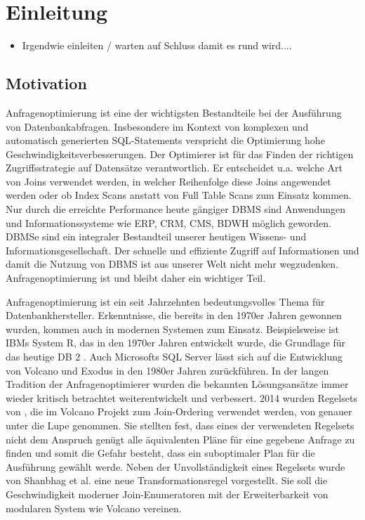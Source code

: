 \chapter{Einleitung}

\begin{itemize}
\item Irgendwie einleiten / warten auf Schluss damit es rund wird....
\end{itemize}



\section{Motivation}


Anfragenoptimierung ist eine der wichtigsten Bestandteile bei der Ausführung von Datenbankabfragen. Insbesondere im Kontext von komplexen und automatisch generierten SQL-Statements verspricht die Optimierung hohe Geschwindigkeitsverbesserungen. Der Optimierer ist für das Finden der richtigen Zugriffsstrategie auf Datensätze verantwortlich. Er entscheidet u.a. welche Art von Joins verwendet werden, in welcher Reihenfolge diese Joins angewendet werden oder ob Index Scans anstatt von Full Table Scans zum Einsatz kommen. Nur durch die erreichte Performance heute gängiger \ac{DBMS} sind Anwendungen und Informationssysteme wie \ac{ERP}, \ac{CRM}, \ac{CMS}, \ac{BDWH} möglich geworden. \ac{DBMS}e sind ein integraler Bestandteil unserer heutigen Wissens- und Informationsgesellschaft. Der schnelle und effiziente Zugriff auf Informationen und damit die Nutzung von \ac{DBMS} ist aus unserer Welt nicht mehr wegzudenken. Anfragenoptimierung ist und bleibt daher ein wichtiger Teil.

Anfragenoptimierung ist ein seit Jahrzehnten bedeutungsvolles Thema für Datenbankhersteller. Erkenntnisse, die bereits in den 1970er Jahren gewonnen wurden, kommen auch in modernen Systemen zum Einsatz. Beispielsweise ist IBMs System R, das in den 1970er Jahren entwickelt wurde, die Grundlage für das heutige DB 2  \cite{wade2012ibm}. Auch Microsofts SQL Server lässt sich auf die Entwicklung von Volcano und Exodus in den 1980er Jahren zurückführen.
In der langen Tradition der Anfragenoptimierer wurden die bekannten Lösungsansätze immer wieder kritisch betrachtet  weiterentwickelt und verbessert. 2014 wurden Regelsets von \cite{pellenkoft1997complexity}, die im Volcano Projekt zum Join-Ordering verwendet werden, von \cite{shanbhag2014optimizing} genauer unter die Lupe genommen. 
Sie stellten fest, dass eines der verwendeten Regelsets nicht dem Anspruch genügt alle äquivalenten Pläne für eine gegebene Anfrage zu finden und somit die Gefahr besteht, dass ein suboptimaler Plan für die Ausführung gewählt werde. Neben der Unvollständigkeit eines Regelsets wurde von Shanbhag et al. eine neue Transformationsregel vorgestellt. Sie soll die Geschwindigkeit moderner Join-Enumeratoren mit der Erweiterbarkeit von modularen System wie Volcano vereinen.

